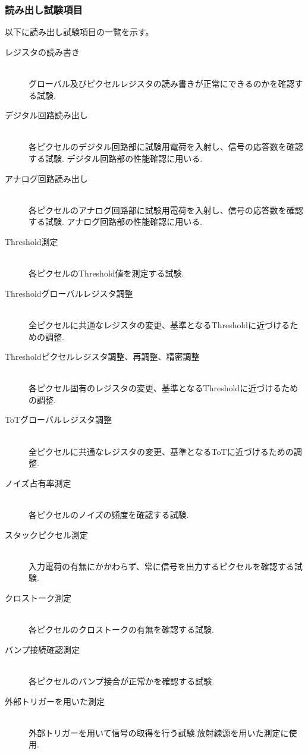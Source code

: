 \subsubsection{読み出し試験項目}
以下に読み出し試験項目の一覧を示す。
\begin{description}
  \item[レジスタの読み書き]\mbox{}\\
グローバル及びピクセルレジスタの読み書きが正常にできるのかを確認する試験.
  \item[デジタル回路読み出し]\mbox{} \\
各ピクセルのデジタル回路部に試験用電荷を入射し、信号の応答数を確認する試験. デジタル回路部の性能確認に用いる.
  \item[アナログ回路読み出し]\mbox{}\\
各ピクセルのアナログ回路部に試験用電荷を入射し、信号の応答数を確認する試験. アナログ回路部の性能確認に用いる.
  \item[Threshold測定]\mbox{}\\
各ピクセルのThreshold値を測定する試験.
  \item[Thresholdグローバルレジスタ調整]\mbox{}\\
全ピクセルに共通なレジスタの変更、基準となるThresholdに近づけるための調整.
  \item[Thresholdピクセルレジスタ調整、再調整、精密調整]\mbox{}\\
各ピクセル固有のレジスタの変更、基準となるThresholdに近づけるための調整.
  \item[ToTグローバルレジスタ調整]\mbox{}\\
全ピクセルに共通なレジスタの変更、基準となるToTに近づけるための調整.
  \item[ノイズ占有率測定]\mbox{}\\
各ピクセルのノイズの頻度を確認する試験.
  \item[スタックピクセル測定]\mbox{}\\
入力電荷の有無にかかわらず、常に信号を出力するピクセルを確認する試験.
  \item[クロストーク測定]\mbox{}\\
各ピクセルのクロストークの有無を確認する試験.
  \item[バンプ接続確認測定]\mbox{}\\
各ピクセルのバンプ接合が正常かを確認する試験.
  \item[外部トリガーを用いた測定]\mbox{}\\
外部トリガーを用いて信号の取得を行う試験.放射線源を用いた測定に使用.
\end{description}

